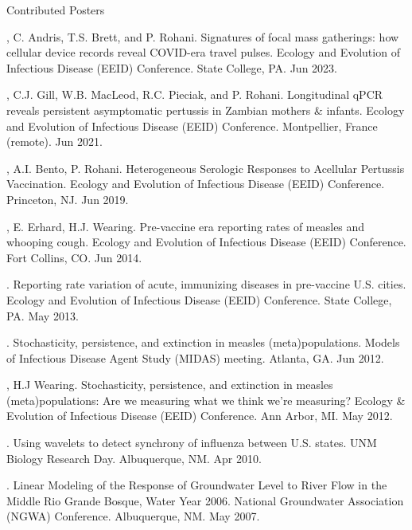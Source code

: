 \documentclass{resume} %
\begin{document}
\clearpage
\begin{rSection}{Contributed Posters}
\item \authSelf, C. Andris, T.S. Brett, and P. Rohani.
Signatures of focal mass gatherings: how cellular device records reveal COVID-era travel pulses. 
Ecology and Evolution of Infectious Disease (EEID) Conference. State College, PA. Jun 2023.
\item \authSelf, C.J. Gill, W.B. MacLeod, R.C. Pieciak, and P. Rohani.
Longitudinal qPCR reveals persistent asymptomatic pertussis in Zambian mothers \& infants.
Ecology and Evolution of Infectious Disease (EEID) Conference. Montpellier, France (remote). Jun 2021.
\item \authSelf, A.I. Bento, P. Rohani.  
Heterogeneous Serologic Responses to Acellular Pertussis Vaccination.
Ecology and Evolution of Infectious Disease (EEID) Conference. Princeton, NJ. Jun 2019.
\item \authSelf, E. Erhard, H.J. Wearing.  Pre-vaccine era reporting
rates of measles and whooping cough. Ecology and Evolution of Infectious Disease
(EEID) Conference. Fort Collins, CO. Jun 2014. 
\item \authSelf. Reporting rate variation of acute, immunizing diseases in
pre-vaccine U.S. cities. Ecology and Evolution of Infectious Disease
(EEID) Conference. State College, PA. May 2013. 
\item \authSelf. Stochasticity, persistence, and extinction in measles
(meta)populations. Models of Infectious Disease Agent Study
(MIDAS) meeting. Atlanta, GA. Jun 2012. 
\item \authSelf, H.J Wearing. Stochasticity, persistence, and extinction in measles
(meta)populations: Are we measuring what we think we're
measuring? Ecology \& Evolution of Infectious Disease (EEID) Conference. Ann Arbor, MI. May 2012.
\item \authSelf. Using wavelets to detect synchrony of influenza between U.S.
states. UNM Biology Research Day. Albuquerque, NM.  Apr 2010. 
\item \authSelf. Linear Modeling of the Response of Groundwater Level to River Flow
in the Middle Rio Grande Bosque, Water Year 2006. National
Groundwater Association (NGWA) Conference. Albuquerque, NM. May 2007. 
\end{rSection}
\end{document}

